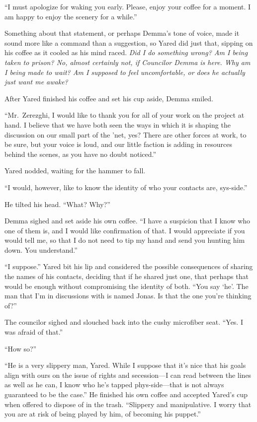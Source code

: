``I must apologize for waking you early. Please, enjoy your coffee for a moment. I am happy to enjoy the scenery for a while.''

Something about that statement, or perhaps Demma's tone of voice, made it sound more like a command than a suggestion, so Yared did just that, sipping on his coffee as it cooled as his mind raced. \emph{Did I do something wrong? Am I being taken to prison? No, almost certainly not, if Councilor Demma is here. Why am I being made to wait? Am I supposed to feel uncomfortable, or does he actually just want me awake?}

After Yared finished his coffee and set his cup aside, Demma smiled.

``Mr.~Zerezghi, I would like to thank you for all of your work on the project at hand. I believe that we have both seen the ways in which it is shaping the discussion on our small part of the 'net, yes? There are other forces at work, to be sure, but your voice is loud, and our little faction is adding in resources behind the scenes, as you have no doubt noticed.''

Yared nodded, waiting for the hammer to fall.

``I would, however, like to know the identity of who your contacts are, sys-side.''

He tilted his head. ``What? Why?''

Demma sighed and set aside his own coffee. ``I have a suspicion that I know who one of them is, and I would like confirmation of that. I would appreciate if you would tell me, so that I do not need to tip my hand and send you hunting him down. You understand.''

``I suppose.'' Yared bit his lip and considered the possible consequences of sharing the names of his contacts, deciding that if he shared just one, that perhaps that would be enough without compromising the identity of both. ``You say `he'. The man that I'm in discussions with is named Jonas. Is that the one you're thinking of?''

The councilor sighed and slouched back into the cushy microfiber seat. ``Yes. I was afraid of that.''

``How so?''

``He is a very slippery man, Yared. While I suppose that it's nice that his goals align with ours on the issue of rights and secession---I can read between the lines as well as he can, I know who he's tapped phys-side---that is not always guaranteed to be the case.'' He finished his own coffee and accepted Yared's cup when offered to dispose of in the trash. ``Slippery and manipulative. I worry that you are at risk of being played by him, of becoming his puppet.''


